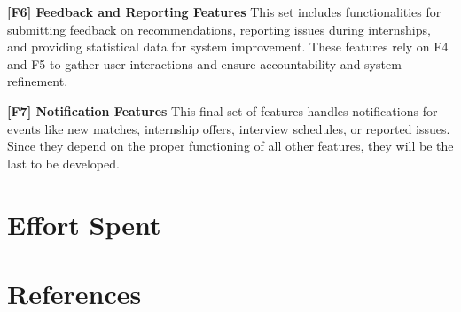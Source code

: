\documentclass{Configuration_Files/PoliMi3i_thesis}
\begin{document}
\textbf{[F6] Feedback and Reporting Features}  
This set includes functionalities for submitting feedback on recommendations, reporting issues during internships, and providing statistical data for system improvement. These features rely on F4 and F5 to gather user interactions and ensure accountability and system refinement.

\textbf{[F7] Notification Features}  
This final set of features handles notifications for events like new matches, internship offers, interview schedules, or reported issues. Since they depend on the proper functioning of all other features, they will be the last to be developed.
  


    


    \chapter{Effort Spent}
    \label{ch:effort_spent}%
    
    

    \chapter{References}
    \label{ch:references}%
    


    \listoffigures
    
    \listoftables
    \cleardoublepage
\end{document}
